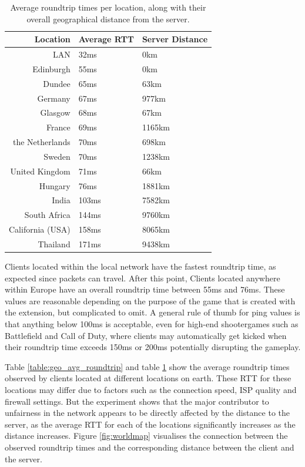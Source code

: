 \documentclass[bsc,frontabs,twoside,singlespacing,parskip,deptreport]{infthesis}     %
\begin{document}
\begin{table}[H]
\centering
  \begin{tabular}{ r | l | l }
Location		& Average RTT	& Server Distance \\ \hline\hline
LAN				& 32ms			&0km\\
Edinburgh		& 55ms			&0km\\
Dundee			& 65ms			&63km\\
Germany			& 67ms			&977km\\
Glasgow			& 68ms			&67km\\
France			& 69ms			&1165km\\
the Netherlands	& 70ms			&698km\\
Sweden			& 70ms			&1238km\\
United Kingdom	& 71ms			&66km\\
Hungary			& 76ms			&1881km\\
India			& 103ms			&7582km\\
South Africa	& 144ms			&9760km\\
California (USA)& 158ms			&8065km\\
Thailand		& 171ms			&9438km\\
  \end{tabular}
  \caption{Average roundtrip times per location, along with their overall geographical distance from the server.}
  \label{table:geo_avg_location}
\end{table}

Clients located within the local network have the fastest roundtrip time, as expected since packets can travel. After this point, Clients located anywhere within Europe have an overall roundtrip time between 55ms and 76ms. These values are reasonable depending on the purpose of the game that is created with the extension, but complicated to omit. A general rule of thumb for ping values is that anything below 100ms is acceptable, even for high-end shootergames such as Battlefield and Call of Duty, where clients may automatically get kicked when their roundtrip time exceeds 150ms or 200ms potentially disrupting the gameplay.

Table \ref{table:geo_avg_roundtrip} and table \ref{table:geo_avg_location} show the average roundtrip times observed by clients located at different locations on earth. These RTT for these locations may differ due to factors such as the connection speed, ISP quality and firewall settings. But the experiment shows that the major contributor to unfairness in the network appears to be directly affected by the distance to the server, as the average RTT for each of the locations significantly increases as the distance increases. Figure \ref{fig:worldmap} visualises the connection between the observed roundtrip times and the corresponding distance between the client and the server. 
\end{document}
